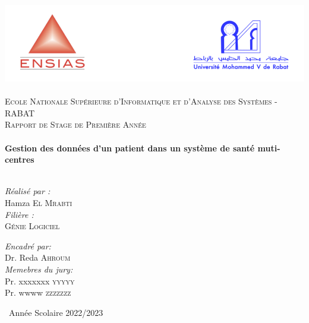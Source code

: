 \begin{titlepage}
\begin{center}

\includegraphics[width=1\textwidth]{./ensiass}~\\[1.5cm]

\textsc{\Large Ecole Nationale Supérieure d’Informatique et d’Analyse des Systèmes - RABAT }\\[2cm]

\textsc{\Large Rapport de Stage de Première Année
}\\[0.5cm]

\HRule \\[0.4cm]

{\huge \bfseries   
 Gestion des données d'un patient dans un système de santé muti-centres
 \\[0.4cm] }
\HRule \\
[2cm]
\begin{minipage}{0.4\textwidth}
\begin{flushleft} \large
\emph{Réalisé par :}\\
Hamza \textsc{El Mrabti}\\ [1cm]

\emph{Filière :} \\
\textsc{Génie Logiciel }\\



\end{flushleft}
\end{minipage}
\begin{minipage}{0.4\textwidth}
\begin{flushright} \large
\emph{Encadré par:} \\
Dr. Reda \textsc{Ahroum}\\[1cm]
\emph{Memebres du jury:} \\
Pr. xxxxxxx \textsc{yyyyy}\\
Pr. wwww \textsc{zzzzzzz}\\[1cm]


\end{flushright}
\end{minipage}

\vfill

{\large \ Année Scolaire 2022/2023}

\end{center}
\end{titlepage}